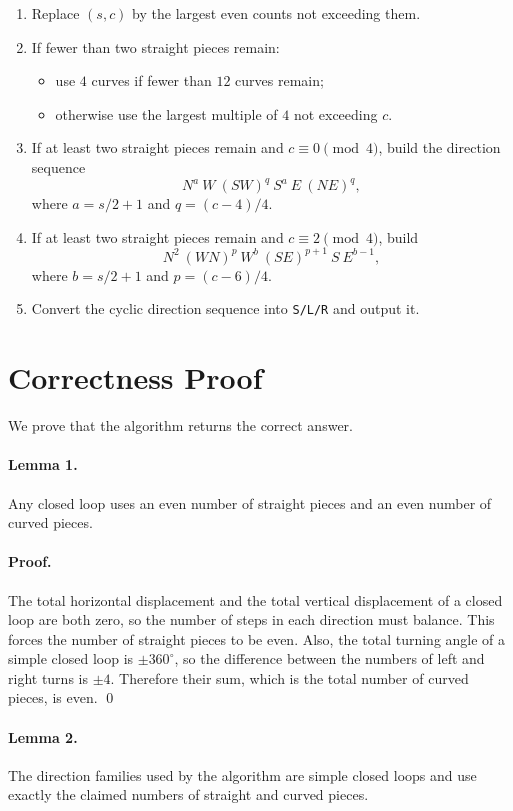\documentclass[11pt]{article}
\begin{document}
\begin{enumerate}[leftmargin=*]
    \item Replace $(s,c)$ by the largest even counts not exceeding them.
    \item If fewer than two straight pieces remain:
    \begin{itemize}[leftmargin=*]
        \item use $4$ curves if fewer than $12$ curves remain;
        \item otherwise use the largest multiple of $4$ not exceeding $c$.
    \end{itemize}
    \item If at least two straight pieces remain and $c \equiv 0 \pmod 4$, build the direction sequence
    \[
    N^a\ W\ (SW)^q\ S^a\ E\ (NE)^q,
    \]
    where $a=s/2+1$ and $q=(c-4)/4$.
    \item If at least two straight pieces remain and $c \equiv 2 \pmod 4$, build
    \[
    N^2\ (WN)^p\ W^b\ (SE)^{p+1}\ S\ E^{b-1},
    \]
    where $b=s/2+1$ and $p=(c-6)/4$.
    \item Convert the cyclic direction sequence into \texttt{S/L/R} and output it.
\end{enumerate}

\section*{Correctness Proof}

We prove that the algorithm returns the correct answer.

\paragraph{Lemma 1.}
Any closed loop uses an even number of straight pieces and an even number of curved pieces.

\paragraph{Proof.}
The total horizontal displacement and the total vertical displacement of a closed loop are both zero, so
the number of steps in each direction must balance. This forces the number of straight pieces to be even.
Also, the total turning angle of a simple closed loop is $\pm 360^\circ$, so the difference between the
numbers of left and right turns is $\pm 4$. Therefore their sum, which is the total number of curved
pieces, is even. \qed

\paragraph{Lemma 2.}
The direction families used by the algorithm are simple closed loops and use exactly the claimed numbers
of straight and curved pieces.
\end{document}
